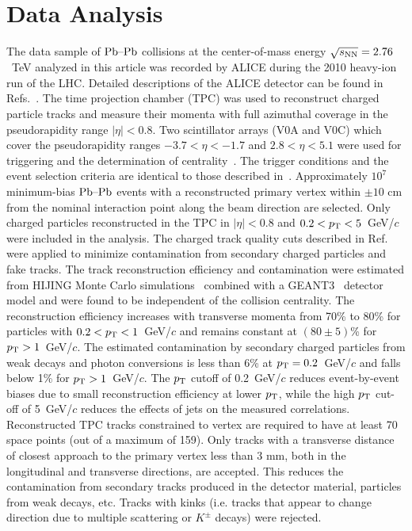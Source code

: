 \section{Data Analysis}
\label{sec:experiment}
The data sample of $\textnormal{Pb--Pb}$ collisions at the center-of-mass energy $\sqrt{s_{\textnormal{NN}}}=2.76$~TeV analyzed in this article was recorded by ALICE during the 2010 heavy-ion run of the LHC.
Detailed descriptions of the ALICE detector can be found
in Refs.~\cite{Aamodt:2008zz,Carminati:2004fp,Alessandro:2006yt}. The time
projection chamber (TPC) was used to reconstruct charged particle
tracks and measure their momenta with full azimuthal coverage in the
pseudorapidity range $|\eta|<0.8$. Two scintillator
arrays (V0A and V0C) which cover the pseudorapidity  ranges $-3.7<\eta<-1.7$
and $2.8<\eta<5.1$ were used for triggering and the determination of
centrality~\cite{Aamodt:2010cz}. The trigger
conditions and the event selection criteria are identical to those
described in~\cite{Aamodt:2010pa, Aamodt:2010cz}.
Approximately $10^7$ minimum-bias $\textnormal{Pb--Pb}$ events with
a reconstructed primary vertex within $\pm 10$ cm from the nominal
interaction point along the beam direction are selected. Only charged particles reconstructed in the TPC in $|\eta|<0.8$
and $0.2<p_{\rm T}<5$~GeV/$c$ were included in the analysis. The charged track quality cuts
described in Ref.~\cite{Aamodt:2010pa} were applied to minimize
contamination from secondary charged particles and fake tracks.
The track reconstruction efficiency and contamination
were estimated from HIJING Monte Carlo
simulations~\cite{Wang:1991hta} combined with a GEANT3~\cite{Brun:1994aa} detector model and were found to be independent of
the collision centrality. The reconstruction efficiency increases with transverse momenta from
70\% to 80\% for particles with $0.2<p_{\rm T}<1$~GeV/$c$ and remains
constant at $(80 \pm 5)$\% for $p_{\rm T}>1$~GeV/$c$. The estimated
contamination by secondary charged particles from weak decays and
photon conversions is less than 6\% at $p_{\rm T}=0.2$~GeV/$c$ and falls
below 1\% for $p_{\rm T}>1$~GeV/$c$.
The $p_{\rm T}$ cutoff of 0.2~GeV/$c$ reduces event-by-event biases due to small reconstruction efficiency 
at lower $p_{\rm T}$, while the high $p_{\rm T}$ cut-off of 5~GeV/$c$ reduces the effects of jets on the measured correlations. 
Reconstructed TPC tracks constrained to vertex are required to have at least 70 space points (out of a maximum of 159). 
Only tracks with a transverse distance of closest approach to the primary vertex less than 3 mm, both in the longitudinal and transverse directions, are accepted. This reduces the contamination from secondary tracks produced in the detector material, particles from weak decays, etc. Tracks with kinks (i.e. tracks that appear to change direction due to multiple scattering or $K^{\pm}$ decays) were rejected.


